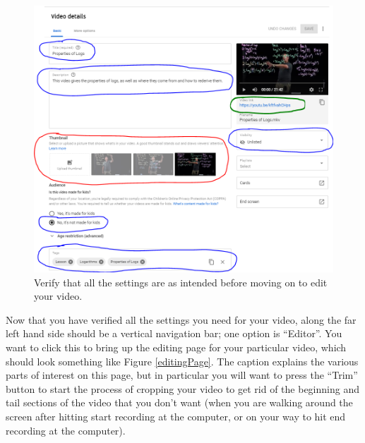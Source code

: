 \documentclass{article}
\begin{document}
        \begin{figure}[h]
            \includegraphics[width=\textwidth]{videoDetails.png}
            \caption{Verify that all the settings are as intended before moving on to edit your video.}
            \label{videoDetails}
        \end{figure}
        
        \newpage
        
        Now that you have verified all the settings you need for your video, along the far left hand side should be a vertical navigation bar; one option is ``Editor''. You want to click this to bring up the editing page for your particular video, which should look something like Figure \ref{editingPage}. The caption explains the various parts of interest on this page, but in particular you will want to press the ``Trim'' button to start the process of cropping your video to get rid of the beginning and tail sections of the video that you don't want (when you are walking around the screen after hitting start recording at the computer, or on your way to hit end recording at the computer).
    
\end{document}
